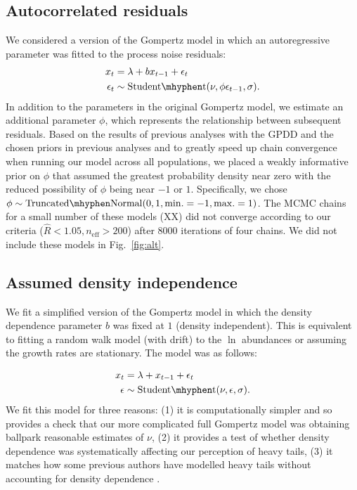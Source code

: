 \subsection{Autocorrelated residuals}

We considered a version of the Gompertz model in which an autoregressive
parameter was fitted to the process noise residuals:
\begin{align*}
x_t &= \lambda + b x_{t-1} + \epsilon_t\\
\epsilon_t &\sim \mathrm{Student\mhyphen t}(\nu, \phi \epsilon_{t-1}, \sigma).
\end{align*}
In addition to the parameters in the original Gompertz model, we estimate an
additional parameter $\phi$, which represents the relationship between
subsequent residuals. Based on the results of previous analyses with the GPDD
\citep[e.g.][]{connors2014} and the chosen priors in previous analyses
\citep[e.g.][]{thorson2014a} and to greatly speed up chain convergence when
running our model across all populations, we placed a weakly informative prior
on $\phi$ that assumed the greatest probability density near zero with the
reduced possibility of $\phi$ being near $-1$ or $1$. Specifically, we chose
$\phi \sim \mathrm{Truncated\mhyphen Normal}(0, 1, \mathrm{min.} = -1,
\mathrm{max.} = 1)$. The MCMC chains for a small number of these models (XX) did
not converge according to our criteria ($\widehat{R} < 1.05, n_\mathrm{eff}
> 200$) after 8000 iterations of four chains. We did not include these models in
Fig.~\ref{fig:alt}.

\subsection{Assumed density independence}\label{assumed-density-independence}

We fit a simplified version of the Gompertz model in which the density
dependence parameter $b$ was fixed at $1$ (density independent). This is
equivalent to fitting a random walk model (with drift) to the $\ln$ abundances
or assuming the growth rates are stationary. The model was as follows:

\begin{align*}
x_t &= \lambda + x_{t-1} + \epsilon_t\\
\epsilon &\sim \mathrm{Student\mhyphen t}(\nu, \epsilon, \sigma).
\end{align*}
We fit this model for three reasons: (1) it is computationally simpler and so
provides a check that our more complicated full Gompertz model was obtaining
ballpark reasonable estimates of $\nu$, (2) it provides a test of whether
density dependence was systematically affecting our perception of heavy tails,
(3) it matches how some previous authors have modelled heavy tails without
accounting for density dependence \citep{segura2013}.

